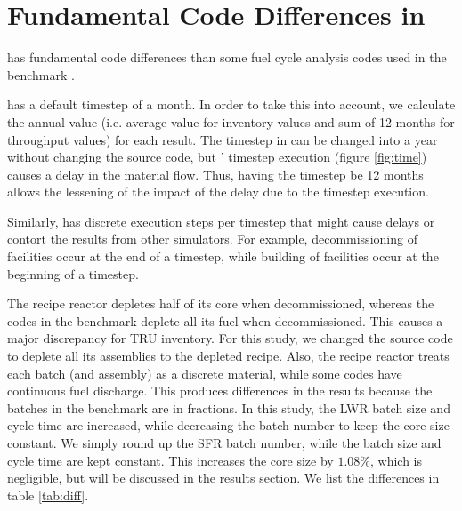 
\section{Fundamental Code Differences in \Cyclus}

\Cyclus has fundamental code differences than some fuel cycle analysis codes
used in the benchmark \cite{feng_standardized_2016}.

\Cyclus has a default timestep of a month. In order to take
this into account, we calculate the annual value
(i.e. average value for inventory values and sum of 12 months
for throughput values) for each result. The timestep in \Cyclus
can be changed into a year without changing the source
code, but \Cyclus' timestep execution (figure \ref{fig:time}) causes a delay
in the material flow. Thus, having the timestep be 12 months
allows the lessening of the impact of the delay due to the
\Cyclus timestep execution.

Similarly, \Cyclus has discrete
execution steps per timestep that might cause delays or contort
the results from other simulators. For example, decommissioning of
facilities occur at the end of a timestep, while building of facilities
occur at the beginning of a timestep.

The \Cycamore recipe reactor depletes half of its core when decommissioned,
whereas the codes in the benchmark \cite{feng_standardized_2016} deplete all its fuel when decommissioned. This causes a major
discrepancy for \gls{TRU} inventory. For this study, we changed
the \Cycamore source code to deplete all its assemblies to the depleted recipe.
Also, the \Cycamore recipe reactor treats each batch (and assembly) as a discrete
material, while some codes have continuous fuel discharge. This produces
differences in the results because the batches in the benchmark \cite{feng_standardized_2016} are in fractions.
In this study, the \gls{LWR} batch size and cycle time are increased, while
decreasing the batch number to keep the core size constant. We simply round
up the \gls{SFR} batch number, while the batch size and cycle time are kept constant.
This increases the core size by $1.08 \%$, which is negligible, but will be
discussed in the results section.
We list the differences in table \ref{tab:diff}.


